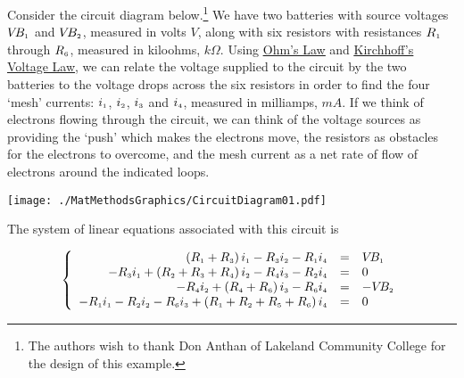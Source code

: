 \documentclass{ximera}
\begin{document}
\begin{example} \label{circuitex} Consider the circuit diagram below.\footnote{The authors wish to thank Don Anthan of Lakeland Community College for the design of this example.}   We have two batteries with source voltages $V\!B_{\mbox{\tiny$1$}}$ and $V\!B_{\mbox{\tiny$2$}}$, measured in volts $V$, along with six resistors with resistances $R_{\mbox{\tiny$1$}}$ through $R_{\mbox{\tiny$6$}}$, measured in kiloohms, $k\Omega$.  Using \href{http://en.wikipedia.org/wiki/Ohm's_law}{\underline{Ohm's Law}}   and \href{http://en.wikipedia.org/wiki/Kirchhoff's_circuit_laws}{\underline{Kirchhoff's Voltage Law}}, we can relate the voltage supplied to the circuit by the two batteries to the voltage drops across the six resistors in order to find the four `mesh' currents: $i_{\mbox{\tiny$1$}}$, $i_{\mbox{\tiny$2$}}$, $i_{\mbox{\tiny$3$}}$ and $i_{\mbox{\tiny$4$}}$, measured in milliamps, $mA$.  If we think of electrons flowing through the circuit, we can think of the voltage sources as providing the `push' which makes the electrons move, the resistors as obstacles for the electrons to overcome, and the mesh current as a net rate of flow of electrons around the indicated loops.


\centerline{\texttt{[image: ./MatMethodsGraphics/CircuitDiagram01.pdf]}}

The system of linear equations associated with this circuit is

\[ \left\{ \begin{array}{rcl} \left(R_{\mbox{\tiny$1$}} + R_{\mbox{\tiny$3$}}\right)i_{\mbox{\tiny$1$}} - R_{\mbox{\tiny$3$}}i_{\mbox{\tiny$2$}} - R_{\mbox{\tiny$1$}}i_{\mbox{\tiny$4$}} & = & V\!B_{\mbox{\tiny$1$}} \\
-R_{\mbox{\tiny$3$}}i_{\mbox{\tiny$1$}} + \left(R_{\mbox{\tiny$2$}} + R_{\mbox{\tiny$3$}} + R_{\mbox{\tiny$4$}}\right)i_{\mbox{\tiny$2$}} - R_{\mbox{\tiny$4$}}i_{\mbox{\tiny$3$}} - R_{\mbox{\tiny$2$}}i_{\mbox{\tiny$4$}} & = & 0 \\
-R_{\mbox{\tiny$4$}}i_{\mbox{\tiny$2$}} + \left(R_{\mbox{\tiny$4$}} + R_{\mbox{\tiny$6$}}\right)i_{\mbox{\tiny$3$}} - R_{\mbox{\tiny$6$}}i_{\mbox{\tiny$4$}} & = & -V\!B_{\mbox{\tiny$2$}} \\
-R_{\mbox{\tiny$1$}}i_{\mbox{\tiny$1$}} - R_{\mbox{\tiny$2$}}i_{\mbox{\tiny$2$}} - R_{\mbox{\tiny$6$}}i_{\mbox{\tiny$3$}} + \left(R_{\mbox{\tiny$1$}} + R_{\mbox{\tiny$2$}} + R_{\mbox{\tiny$5$}} + R_{\mbox{\tiny$6$}}\right)i_{\mbox{\tiny$4$}} & = & 0 \\  \end{array} \right.\]


\end{example}
\end{document}
